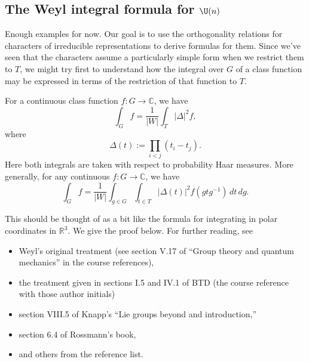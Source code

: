 \documentclass[reqno]{amsart} 
\begin{document}
\subsection{The Weyl integral formula
  for \texorpdfstring{$\U(n)$}{U(n)}}\label{sec:weyl-integr-form}
Enough examples for now.  Our goal is to use the orthogonality relations for characters of irreducible representations to derive formulas for them.  Since we've seen that the characters assume a particularly simple form when we restrict them to $T$, we might try first to understand how the integral over $G$ of a class function may be expressed in terms of the restriction of that function to $T$.
\begin{theorem}\label{thm:weyl-int}
  For a continuous class function $f : G \rightarrow \mathbb{C}$, we have
  \begin{equation*}
    \int_G f = \frac{1}{|W|} \int_T |\Delta|^2 f,
  \end{equation*}
  where
  \begin{equation*}
    \Delta(t) := \prod_{i < j} (t_i - t_j).
  \end{equation*}
  Here both integrals are taken with respect to probability Haar measures.  More generally, for any continuous $f : G \rightarrow \mathbb{C}$, we have
  \begin{equation*}
    \int_G f = \frac{1}{|W|} \int_{g \in G} \int_{t \in T} |\Delta(t)|^2 f(g t g^{-1}) \, d t \, d g.
  \end{equation*}
\end{theorem}
This should be thought of as a bit like the formula for integrating in polar coordinates in $\mathbb{R}^3$.  We give the proof below.  For further reading, see
\begin{itemize}
\item Weyl's original treatment (see section V.17 of ``Group theory and quantum mechanics'' in the course references),
\item the treatment given in sections I.5 and IV.1 of BTD (the course reference with those author initials)
\item section VIII.5 of Knapp's ``Lie groups beyond and introduction,''
\item section 6.4 of Rossmann's book,
\item and others from the reference list.
\end{itemize}
\end{document}
